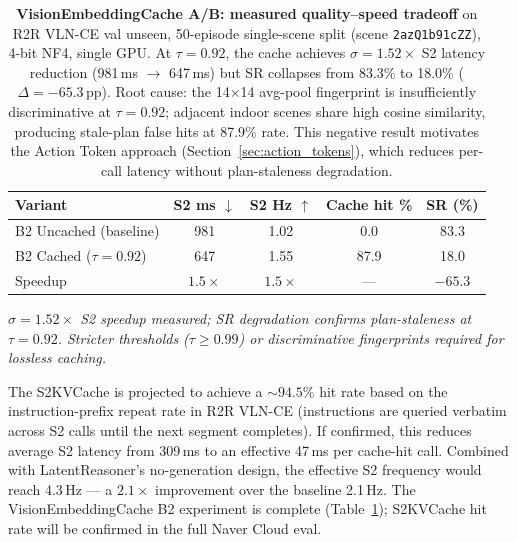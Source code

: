 \documentclass[10pt,twocolumn,letterpaper]{article}
\begin{document}
\begin{table}[h]
\centering
\caption{\textbf{VisionEmbeddingCache A/B: measured quality–speed tradeoff} on R2R VLN-CE val unseen, 50-episode single-scene split (scene \texttt{2azQ1b91cZZ}), 4-bit NF4, single GPU.
At $\tau=0.92$, the cache achieves $\sigma=1.52\times$ S2 latency reduction (981\,ms $\to$ 647\,ms) but SR collapses from 83.3\% to 18.0\% ($\Delta=-65.3$\,pp). Root cause: the 14$\times$14 avg-pool fingerprint is insufficiently discriminative at $\tau=0.92$; adjacent indoor scenes share high cosine similarity, producing stale-plan false hits at 87.9\% rate. This negative result motivates the Action Token approach (Section~\ref{sec:action_tokens}), which reduces per-call latency without plan-staleness degradation.}
\label{tab:vision_cache_ab}
\small
\begin{tabular}{lcccc}
\toprule
\textbf{Variant} & \textbf{S2 ms $\downarrow$} & \textbf{S2 Hz $\uparrow$} & \textbf{Cache hit \%} & \textbf{SR (\%)} \\
\midrule
B2 Uncached (baseline) & 981 & 1.02 & 0.0 & 83.3 \\
B2 Cached ($\tau=0.92$) & 647 & 1.55 & 87.9 & 18.0 \\
\midrule
Speedup & $1.5\times$ & $1.5\times$ & — & $-65.3$ \\
\bottomrule
\end{tabular}
\vspace{0.5em}

\textit{$\sigma=1.52\times$ S2 speedup measured; SR degradation confirms plan-staleness at $\tau=0.92$. Stricter thresholds ($\tau\geq0.99$) or discriminative fingerprints required for lossless caching.}
\end{table}

The S2KVCache is projected to achieve a ${\sim}94.5$\% hit rate based on the instruction-prefix repeat rate in R2R VLN-CE (instructions are queried verbatim across S2 calls until the next segment completes). If confirmed, this reduces average S2 latency from 309\,ms to an effective 47\,ms per cache-hit call. Combined with LatentReasoner's no-generation design, the effective S2 frequency would reach 4.3\,Hz — a $2.1\times$ improvement over the baseline 2.1\,Hz. The VisionEmbeddingCache B2 experiment is complete (Table~\ref{tab:vision_cache_ab}); S2KVCache hit rate will be confirmed in the full Naver Cloud eval.
\end{document}
